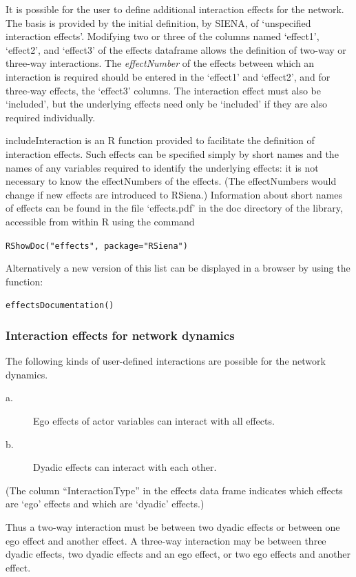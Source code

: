 \documentclass[a4paper,fleqn]{article}
\newcommand{\+}{\, + \,}
\newcommand{\sfn}[1]{\textsf{#1}}
\newcommand{\R}{{\sf R }}
\newcommand{\rs}{{\sf RSiena}}
\newcommand{\si}{{\sf SIENA}}
\begin{document}
{It is possible for the user to define additional interaction effects for the
network. %
The basis is provided by the initial definition, by \si, of `unspecified
interaction effects'.  Modifying two or three of the columns named `effect1',
`effect2', and `effect3' of the effects dataframe
allows the definition of two-way
or three-way interactions. The \emph{effectNumber} of the effects between which
an interaction is required should be entered in the `effect1' and `effect2',
and for three-way effects, the `effect3' columns. The interaction effect must
also be `included', but the underlying effects need only be `included' if
they are also required individually.

\sfn{includeInteraction} is an \R function provided to facilitate the definition
of interaction effects. Such effects can be specified simply by short names and
the names of any variables required to identify the underlying effects: it is
not necessary to know the effectNumbers of the effects. (The effectNumbers would
change if new effects are introduced to \rs.) Information about short names of
effects can be found in the file `effects.pdf' in the doc directory of the
library, accessible from within \R using the command

\verb|RShowDoc("effects", package="RSiena")|

Alternatively a new version of this list can be displayed in a browser by using
the function:

\verb|effectsDocumentation()|

\subsubsection{Interaction effects for network dynamics}

The following kinds of user-defined interactions are possible
for the network dynamics.
\begin{description}
\item[a.]
  Ego effects of actor variables can interact with all effects.
  \item[b.] Dyadic effects can interact with each other.
\end{description}
(The column ``InteractionType'' in the effects data frame indicates which
effects are `ego' effects and which are `dyadic' effects.)

Thus a two-way interaction must be between two dyadic effects or between one
ego effect and another effect. A three-way interaction may be between three
dyadic effects, two dyadic effects and an ego effect, or two ego effects and
another effect.

}
\end{document}

